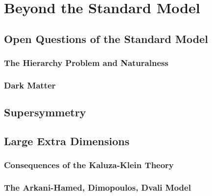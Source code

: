 \documentclass[10pt,twoside,cucitura,classica,english,openany]{toptesi}
\begin{document}


\chapter{Beyond the Standard Model}
\label{cha:beyond-stand-model}

\section{Open Questions of the Standard Model}
\label{sec:open-quest-stand}



\subsection{The Hierarchy Problem and Naturalness}
\label{sec:hier-probl-natur}



\subsection{Dark Matter}
\label{sec:dark-matter}



\section{Supersymmetry}
\label{sec:supersymmetry}



\section{Large Extra Dimensions}
\label{sec:large-extra-dimens}



\subsection{Consequences of the Kaluza-Klein Theory}
\label{sec:cons-kaluza-klein}



\subsection{The Arkani-Hamed, Dimopoulos, Dvali Model}
\label{sec:arkani-hamed-dimop}
\end{document}
